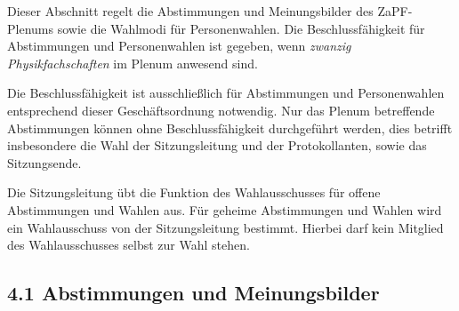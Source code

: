 \documentclass[12pt,oneside]{scrartcl}
\begin{document}
Dieser Abschnitt regelt die Abstimmungen und Meinungsbilder des ZaPF-Plenums
sowie die Wahlmodi für Personenwahlen. Die Beschlussfähigkeit für Abstimmungen
und Personenwahlen ist gegeben, wenn \emph{zwanzig Physikfachschaften}
im Plenum anwesend sind.

Die Beschlussfähigkeit ist ausschließlich für Abstimmungen und Personenwahlen
entsprechend dieser Geschäftsordnung notwendig.
Nur das Plenum betreffende Abstimmungen können ohne Beschlussfähigkeit
durchgeführt werden, dies betrifft insbesondere die Wahl der Sitzungsleitung und der
Protokollanten, sowie das Sitzungsende.

Die Sitzungsleitung übt die Funktion des Wahlausschusses für offene Abstimmungen und
Wahlen aus. Für geheime Abstimmungen und Wahlen wird ein Wahlausschuss von der
Sitzungsleitung bestimmt. Hierbei darf kein Mitglied des Wahlausschusses selbst zur
Wahl stehen.


\subsection{4.1 Abstimmungen und Meinungsbilder%
  \label{abstimmungen-und-meinungsbilder}%
}
\end{document}
